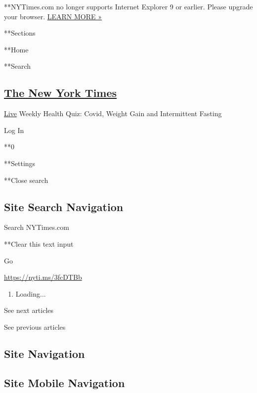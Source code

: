  **NYTimes.com no longer supports Internet Explorer 9 or earlier. Please
upgrade your browser.
\href{http://www.nytimes.com/content/help/site/ie9-support.html}{LEARN
MORE »}

**Sections

**Home

**Search

\hypertarget{the-new-york-times}{%
\subsection{\texorpdfstring{\href{http://www.nytimes.com/}{The New York
Times}}{The New York Times}}\label{the-new-york-times}}

 \href{https://www.nytimes.com/section/well/live}{Live} \textbar{}Weekly
Health Quiz: Covid, Weight Gain and Intermittent Fasting

Log In

**0

**Settings

**Close search

\hypertarget{site-search-navigation}{%
\subsection{Site Search Navigation}\label{site-search-navigation}}

Search NYTimes.com

**Clear this text input

Go

\url{https://nyti.ms/3fcDTBb}

\begin{enumerate}
\def\labelenumi{\arabic{enumi}.}
\item
  Loading...
\end{enumerate}

See next articles

See previous articles

\hypertarget{site-navigation}{%
\subsection{Site Navigation}\label{site-navigation}}

\hypertarget{site-mobile-navigation}{%
\subsection{Site Mobile Navigation}\label{site-mobile-navigation}}

